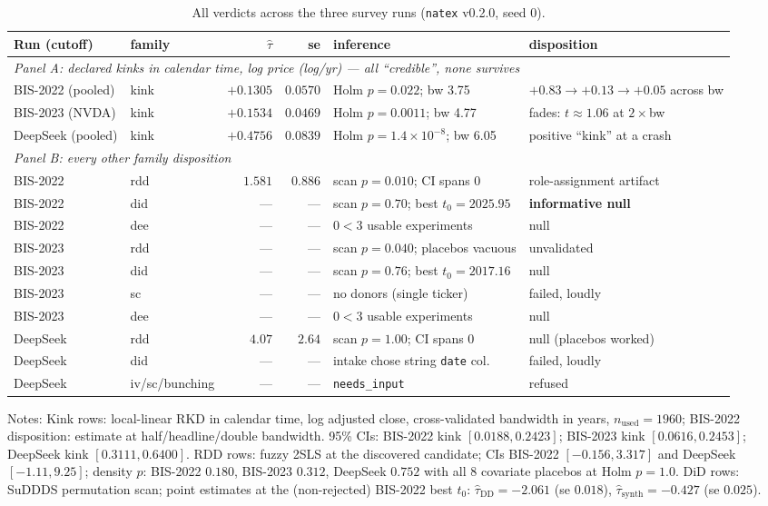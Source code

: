 \documentclass[11pt]{article}
\newcommand{\natex}{\texttt{natex}}
\begin{document}
\begin{table}[t]
\centering
\footnotesize
\setlength{\tabcolsep}{3pt}
\caption{All verdicts across the three survey runs (\natex{} v0.2.0, seed 0).}
\label{tab:main}
\scriptsize
\begin{tabular}{llrrll}
\toprule
Run (cutoff) & family & $\hat\tau$ & se & inference & disposition \\
\midrule
\multicolumn{6}{l}{\emph{Panel A: declared kinks in calendar time, log price
(log/yr) --- all ``credible'', none survives}}\\
BIS-2022 (pooled)  & kink & $+0.1305$ & $0.0570$ & Holm $p{=}0.022$; bw 3.75
  & $+0.83 \to +0.13 \to +0.05$ across bw \\
BIS-2023 (NVDA)    & kink & $+0.1534$ & $0.0469$ & Holm $p{=}0.0011$; bw 4.77
  & fades: $t{\approx}1.06$ at $2{\times}$bw \\
DeepSeek (pooled)  & kink & $+0.4756$ & $0.0839$ & Holm $p{=}1.4{\times}10^{-8}$; bw 6.05
  & positive ``kink'' at a crash \\
\midrule
\multicolumn{6}{l}{\emph{Panel B: every other family disposition}}\\
BIS-2022  & rdd  & $1.581$ & $0.886$ & scan $p{=}0.010$; CI spans 0
  & role-assignment artifact \\
BIS-2022  & did  & --- & --- & scan $p{=}0.70$; best $t_0{=}2025.95$
  & \textbf{informative null} \\
BIS-2022  & dee  & --- & --- & $0<3$ usable experiments & null \\
BIS-2023  & rdd  & --- & --- & scan $p{=}0.040$; placebos vacuous
  & unvalidated \\
BIS-2023  & did  & --- & --- & scan $p{=}0.76$; best $t_0{=}2017.16$ & null \\
BIS-2023  & sc   & --- & --- & no donors (single ticker) & failed, loudly \\
BIS-2023  & dee  & --- & --- & $0<3$ usable experiments & null \\
DeepSeek  & rdd  & $4.07$ & $2.64$ & scan $p{=}1.00$; CI spans 0
  & null (placebos worked) \\
DeepSeek  & did  & --- & --- & intake chose string \texttt{date} col.
  & failed, loudly \\
DeepSeek  & iv/sc/bunching & --- & --- & \texttt{needs\_input} & refused \\
\bottomrule
\end{tabular}

\medskip
\parbox{0.94\textwidth}{\footnotesize Notes: Kink rows: local-linear RKD in
calendar time, log adjusted close, cross-validated bandwidth in years,
$n_{\mathrm{used}}=1960$; BIS-2022 disposition: estimate at
half/headline/double bandwidth. 95\% CIs: BIS-2022 kink $[0.0188,
0.2423]$; BIS-2023 kink $[0.0616, 0.2453]$; DeepSeek kink $[0.3111,
0.6400]$. RDD rows: fuzzy 2SLS at the discovered candidate; CIs BIS-2022
$[-0.156, 3.317]$ and DeepSeek $[-1.11, 9.25]$; density $p$: BIS-2022
$0.180$, BIS-2023 $0.312$, DeepSeek $0.752$ with all 8 covariate placebos at
Holm $p=1.0$. DiD rows: SuDDDS permutation scan; point estimates at the
(non-rejected) BIS-2022 best $t_0$: $\hat\tau_{\mathrm{DD}}=-2.061$ (se
$0.018$), $\hat\tau_{\mathrm{synth}}=-0.427$ (se $0.025$).}
\end{table}
\end{document}
